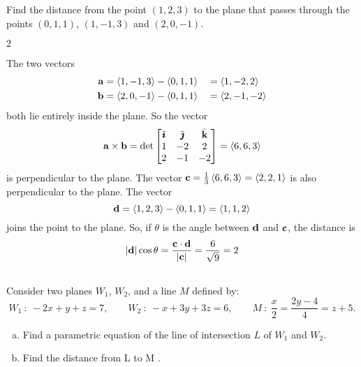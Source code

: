 \begin{question}[M200 2004A] %
Find the distance from the point $(1,2,3)$ to the plane that passes through
the points $(0,1,1)$, $(1,-1,3)$ and $(2,0,-1)$.
\end{question}

%

\begin{answer}
$2$
\end{answer}

\begin{solution}
The two vectors
\begin{alignat*}{3}
\mathbf{a}&=\left< 1,-1,3\right> - \left< 0,1,1\right> &&= \left< 1,-2, 2\right> \\
\mathbf{b}&=\left< 2,0,-1\right> - \left< 0,1,1\right> &&= \left< 2,-1,-2\right>
\end{alignat*}
both lie entirely inside the plane. So the vector
\begin{equation*}
\mathbf{a}\times\mathbf{b}
   =\det\left[\begin{matrix}
           \hat{\pmb{\imath}} & \hat{\pmb{\jmath}} & \hat{\mathbf{k}} \\
            1  &  -2  &  2 \\
            2  &  -1 &  -2
  \end{matrix}\right]
   =\left< 6,6,3\right>
\end{equation*}
is perpendicular to the plane. The vector 
     $\mathbf{c}=\frac{1}{3}\left< 6,6,3\right> =\left< 2,2,1\right>$
is also perpendicular to the plane. The vector 
\begin{equation*}
\mathbf{d}=\left< 1,2,3\right>-\left< 0,1,1\right>=\left< 1,1,2\right>
\end{equation*}
joins the point to the plane. So, if $\theta$ is the angle between $\mathbf{d}$ and
$\mathbf{c}$, the distance is
\begin{equation*}
|\mathbf{d}|\cos\theta=\frac{\mathbf{c}\cdot\mathbf{d}}{|\mathbf{c}|}=\frac{6}{\sqrt{9}}=2
\end{equation*}

\end{solution}



\subsection*{\Application}

\begin{question}[M200 2014A] %
Consider two planes $W_1$, $W_2$, and a line $M$ defined by:
\begin{equation*}
W_1\ :\  -2x + y + z = 7,\qquad
W_2\ :\ -x + 3y + 3z = 6,\qquad
M\ :\ 
\frac{x}{2} = \frac{2y-4}{4} = z + 5.
\end{equation*}
\begin{enumerate}[(a)]
\item
Find a parametric equation of the line of intersection $L$ of $W_1$ and $W_2$.
\item
Find the distance from L to M .
\end{enumerate}
\end{question}

